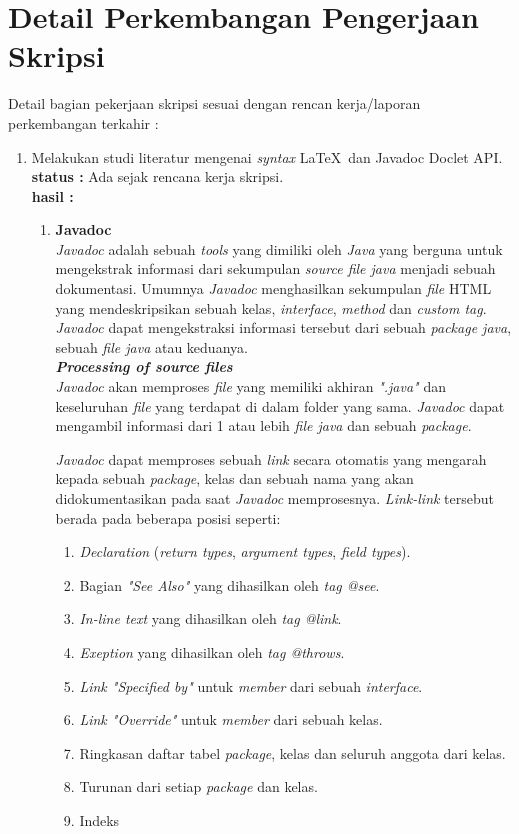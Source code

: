 \documentclass[a4paper,twoside]{article}
\begin{document}
\section{Detail Perkembangan Pengerjaan Skripsi}
Detail bagian pekerjaan skripsi sesuai dengan rencan kerja/laporan perkembangan terkahir :
	\begin{enumerate}
		\item Melakukan studi literatur mengenai {\it syntax} \LaTeX\ dan Javadoc Doclet API.\\
		{\bf status :} Ada sejak rencana kerja skripsi.\\
		{\bf hasil :} 
		\begin{enumerate}
			\item \textbf{Javadoc}\\
			{\it Javadoc} adalah sebuah {\it tools} yang dimiliki oleh {\it Java} yang berguna untuk mengekstrak informasi dari sekumpulan {\it source file java} menjadi sebuah dokumentasi. Umumnya {\it Javadoc} menghasilkan sekumpulan {\it file} HTML yang mendeskripsikan sebuah kelas, {\it interface}, {\it method} dan {\it custom tag}. {\it Javadoc} dapat mengekstraksi informasi tersebut dari sebuah {\it package java}, sebuah {\it file java} atau keduanya.\\

\textbf{\textit{Processing of source files}}\\
{\it Javadoc} akan memproses {\it file} yang memiliki akhiran {\it ".java"} dan keseluruhan {\it file} yang terdapat di dalam folder yang sama. {\it Javadoc} dapat mengambil informasi dari 1 atau lebih {\it file java} dan sebuah {\it package}.

{\it Javadoc} dapat memproses sebuah {\it link} secara otomatis yang mengarah kepada sebuah {\it package}, kelas dan sebuah nama yang akan didokumentasikan pada saat {\it Javadoc} memprosesnya. {\it Link-link} tersebut berada pada beberapa posisi seperti:
\begin{enumerate}
	\item {\it Declaration} ({\it return types}, {\it argument types}, {\it field types}).
	\item Bagian {\it "See Also"} yang dihasilkan oleh {\it tag @see}.
	\item {\it In-line text} yang dihasilkan oleh {\it tag {@link}}.
	\item {\it Exeption} yang dihasilkan oleh {\it tag @throws}.
	\item {\it Link "Specified by"} untuk {\it member} dari sebuah {\it interface}.
	\item {\it Link "Override"} untuk {\it member} dari sebuah kelas.
	\item Ringkasan daftar tabel {\it package}, kelas dan seluruh anggota dari kelas.
	\item Turunan dari setiap {\it package} dan kelas.
	\item Indeks
\end{enumerate}


\end{enumerate}
\end{enumerate}
\end{document}
